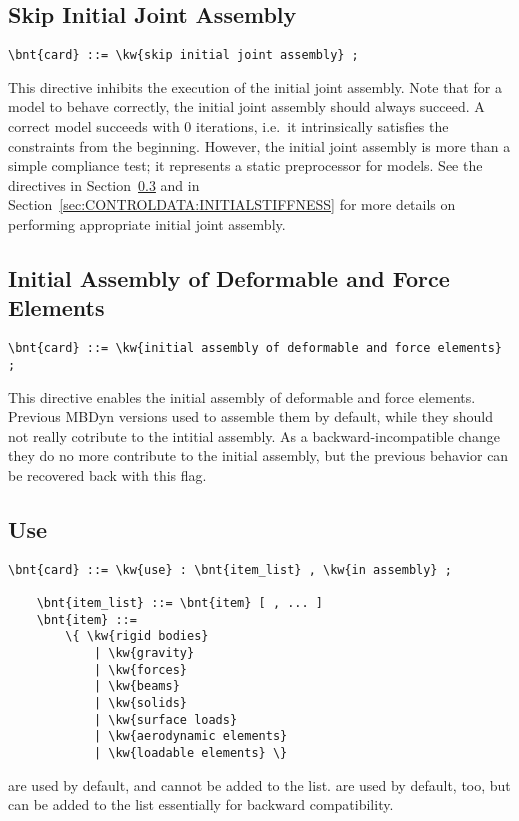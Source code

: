 \subsection{Skip Initial Joint Assembly}
\begin{Verbatim}[commandchars=\\\{\}]
    \bnt{card} ::= \kw{skip initial joint assembly} ;
\end{Verbatim}
This directive inhibits the execution of the initial joint assembly.
Note that for a model to behave correctly, the initial joint assembly
should always succeed.
A correct model succeeds with 0 iterations, i.e.\ it intrinsically 
satisfies the constraints from the beginning.
However, the initial joint assembly is more than a simple compliance
test; it represents a static preprocessor for models.
See the directives  in Section~\ref{sec:CONTROLDATA:USE}
and  in Section~\ref{sec:CONTROLDATA:INITIALSTIFFNESS}
for more details on performing appropriate initial joint assembly.

\subsection{Initial Assembly of Deformable and Force Elements}
\begin{Verbatim}[commandchars=\\\{\}]
    \bnt{card} ::= \kw{initial assembly of deformable and force elements} ;
\end{Verbatim}
This directive enables the initial assembly of deformable and force elements.
Previous MBDyn versions used to assemble them by default, while they should not 
really cotribute to the intitial assembly.
As a backward-incompatible change they do no more contribute to the initial assembly,
but the previous behavior can be recovered back with this flag.


\subsection{Use}\label{sec:CONTROLDATA:USE}
\begin{Verbatim}[commandchars=\\\{\}]
    \bnt{card} ::= \kw{use} : \bnt{item_list} , \kw{in assembly} ;

    \bnt{item_list} ::= \bnt{item} [ , ... ]
    \bnt{item} ::=
        \{ \kw{rigid bodies}
            | \kw{gravity}
            | \kw{forces}
            | \kw{beams}
            | \kw{solids}
            | \kw{surface loads}
            | \kw{aerodynamic elements}
            | \kw{loadable elements} \} 
\end{Verbatim}
 are used by default, and cannot be added to the list.
 are used by default, too, but can be added to the list
essentially for backward compatibility.

